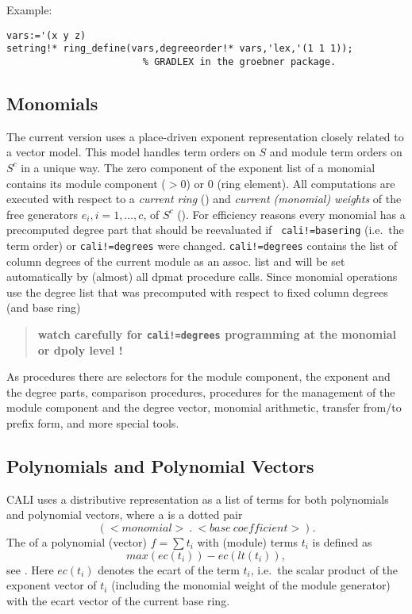 \noindent Example:
\begin{verbatim}
vars:='(x y z)
setring!* ring_define(vars,degreeorder!* vars,'lex,'(1 1 1));
                        % GRADLEX in the groebner package.
\end{verbatim}

\subsection{Monomials}

The current version uses a place-driven exponent representation
closely related to a vector model. This model handles term orders  on $S$
and module term orders on $S^c$ in a unique way. The zero component of the
exponent list of a monomial contains its module component ($>0$) or 0
(ring element). All computations are executed with respect to a
{\em current ring} () and {\em current (monomial)
weights} of the free generators $e_i, i=1,\ldots,c$, of $S^c$
(). For efficiency reasons every monomial has a
precomputed degree part that should be reevaluated if {\tt
cali!=basering} (i.e.\ the term order) or {\tt cali!=degrees} were
changed. {\tt cali!=degrees} contains the list of column degrees of
the current module as an assoc. list and will be set automatically by
(almost) all dpmat procedure calls. Since monomial operations use the
degree list that was precomputed with respect to fixed column degrees
(and base ring)
\begin{quote}\bf
watch carefully for {\tt cali!=degrees} programming at the monomial
or dpoly level !
\end{quote}

As procedures there are selectors for the module component, the exponent and
the degree parts, comparison procedures, procedures for the management of
the module component and the degree vector, monomial arithmetic, transfer
from/to prefix form, and more special tools.

\subsection{Polynomials and Polynomial Vectors}

CALI uses a distributive representation as a list of terms for both
polynomials and polynomial vectors, where a  is a dotted
pair
\[(<monomial>\ .\ <base\ coefficient>).\]
The  of a polynomial (vector) $f=\sum{t_i}$ with (module)
terms $t_i$ is defined as \[max(ec(t_i))-ec(lt(t_i)),\] see
\cite{tcah}. Here $ec(t_i)$ denotes the ecart of the term $t_i$, i.e.\
the scalar product of the exponent vector of $t_i$ (including the
monomial weight of the module generator) with the ecart vector of the
current base ring.

